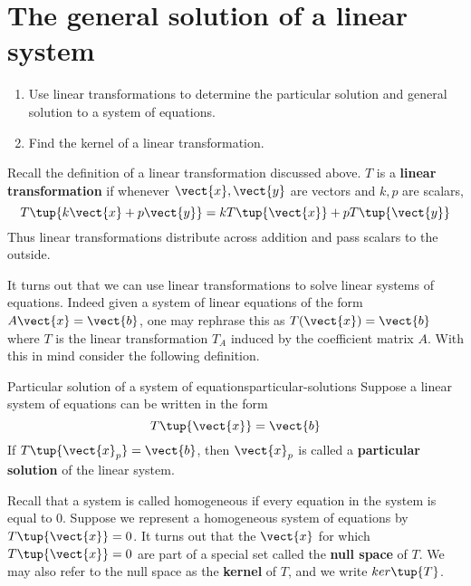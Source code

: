 \section{The general solution of a linear system}

\begin{outcome}
  \begin{enumerate}
  \item Use linear transformations to determine the particular
    solution and general solution to a system of equations.
  \item Find the kernel of a linear transformation.
  \end{enumerate}
\end{outcome}

Recall the definition of a linear transformation discussed above. 
$T$ is a \textbf{linear transformation} if whenever $\vect{x}, \vect{y}$ are
vectors and $k,p$ are scalars,
\begin{equation*}
T\tup{k\vect{x}+p\vect{y}} =k T \tup{\vect{x} } +p T\tup{\vect{y} }
\end{equation*}
Thus linear transformations distribute across addition and pass scalars to
the outside.

It turns out that we can use linear transformations to solve linear
systems of equations. Indeed given a system of linear equations of the
form $A\vect{x}=\vect{b}$, one may rephrase this as $T(\vect{x})=\vect{b}$ where $T$ is the linear
transformation $T_A$ induced by the coefficient matrix $A$. With this in mind consider the following definition. 

\begin{definition}{Particular solution of a system of equations}{particular-solutions}
Suppose a linear system of equations can be written in the form
\begin{equation*}
T\tup{\vect{x}}=\vect{b}
\end{equation*}
If $T\tup{\vect{x}_{p}}=\vect{b}$, 
then $\vect{x}_{p}$ is called a \textbf{particular solution} of
the linear system.
\end{definition}

Recall that a system is called homogeneous if every equation in the system is equal to $0$. 
Suppose we represent a homogeneous system of equations by $T\tup{\vect{x}}=0$. It turns out
that the $\vect{x}$ for which $T \tup{\vect{x}} = 0$ are part of a special set called the \textbf{null space}
of $T$. We may also refer to the null space as the \textbf{kernel} of $T$, and we write $ker\tup{T}$. 

